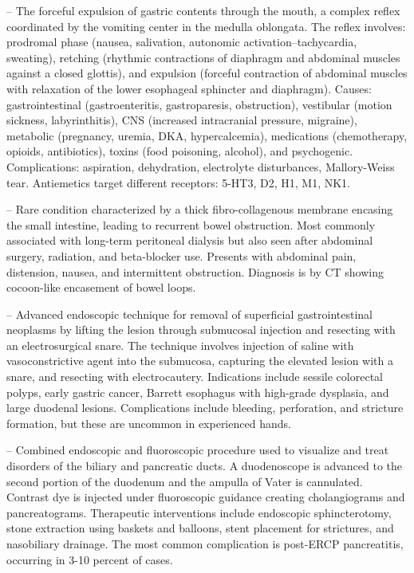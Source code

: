 -- The forceful expulsion of gastric contents through the mouth, a complex reflex coordinated by the vomiting center in the medulla oblongata. The reflex involves: prodromal phase (nausea, salivation, autonomic activation--tachycardia, sweating), retching (rhythmic contractions of diaphragm and abdominal muscles against a closed glottis), and expulsion (forceful contraction of abdominal muscles with relaxation of the lower esophageal sphincter and diaphragm). Causes: gastrointestinal (gastroenteritis, gastroparesis, obstruction), vestibular (motion sickness, labyrinthitis), CNS (increased intracranial pressure, migraine), metabolic (pregnancy, uremia, DKA, hypercalcemia), medications (chemotherapy, opioids, antibiotics), toxins (food poisoning, alcohol), and psychogenic. Complications: aspiration, dehydration, electrolyte disturbances, Mallory-Weiss tear. Antiemetics target different receptors: 5-HT3, D2, H1, M1, NK1.

-- Rare condition characterized by a thick fibro-collagenous membrane encasing the small intestine, leading to recurrent bowel obstruction. Most commonly associated with long-term peritoneal dialysis but also seen after abdominal surgery, radiation, and beta-blocker use. Presents with abdominal pain, distension, nausea, and intermittent obstruction. Diagnosis is by CT showing cocoon-like encasement of bowel loops.

-- Advanced endoscopic technique for removal of superficial gastrointestinal neoplasms by lifting the lesion through submucosal injection and resecting with an electrosurgical snare. The technique involves injection of saline with vasoconstrictive agent into the submucosa, capturing the elevated lesion with a snare, and resecting with electrocautery. Indications include sessile colorectal polyps, early gastric cancer, Barrett esophagus with high-grade dysplasia, and large duodenal lesions. Complications include bleeding, perforation, and stricture formation, but these are uncommon in experienced hands.

-- Combined endoscopic and fluoroscopic procedure used to visualize and treat disorders of the biliary and pancreatic ducts. A duodenoscope is advanced to the second portion of the duodenum and the ampulla of Vater is cannulated. Contrast dye is injected under fluoroscopic guidance creating cholangiograms and pancreatograms. Therapeutic interventions include endoscopic sphincterotomy, stone extraction using baskets and balloons, stent placement for strictures, and nasobiliary drainage. The most common complication is post-ERCP pancreatitis, occurring in 3-10 percent of cases.

